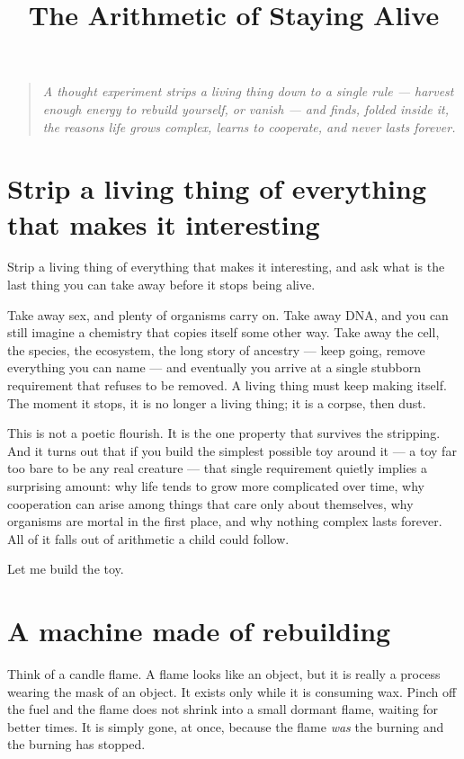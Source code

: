 \documentclass{article}
\title{The Arithmetic of Staying Alive}
\author{}
\date{}
\begin{document}
\maketitle

\begin{quote}
\emph{A thought experiment strips a living thing down to a single rule --- harvest enough energy to rebuild yourself, or vanish --- and finds, folded inside it, the reasons life grows complex, learns to cooperate, and never lasts forever.}
\end{quote}

\section*{Strip a living thing of everything that makes it interesting}

Strip a living thing of everything that makes it interesting, and ask what is the last thing you can take away before it stops being alive.

Take away sex, and plenty of organisms carry on. Take away DNA, and you can still imagine a chemistry that copies itself some other way. Take away the cell, the species, the ecosystem, the long story of ancestry --- keep going, remove everything you can name --- and eventually you arrive at a single stubborn requirement that refuses to be removed. A living thing must keep making itself. The moment it stops, it is no longer a living thing; it is a corpse, then dust.

This is not a poetic flourish. It is the one property that survives the stripping. And it turns out that if you build the simplest possible toy around it --- a toy far too bare to be any real creature --- that single requirement quietly implies a surprising amount: why life tends to grow more complicated over time, why cooperation can arise among things that care only about themselves, why organisms are mortal in the first place, and why nothing complex lasts forever. All of it falls out of arithmetic a child could follow.

Let me build the toy.

\section*{A machine made of rebuilding}

Think of a candle flame. A flame looks like an object, but it is really a process wearing the mask of an object. It exists only while it is consuming wax. Pinch off the fuel and the flame does not shrink into a small dormant flame, waiting for better times. It is simply gone, at once, because the flame \emph{was} the burning and the burning has stopped.
\end{document}
